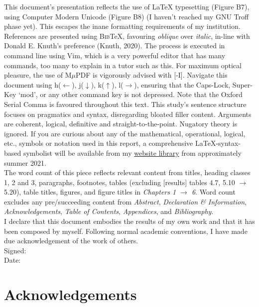 \documentclass[11pt, english]{article}
\begin{document}
	This document’s presentation reflects the use of {\LaTeX} typesetting (Figure B7), using Computer Modern Unicode (Figure B8) (I haven't reached my GNU Troff phase yet). This escapes the inane formatting requirements of my institution. References are presented using \textsc{Bib}{\TeX}, favouring \textsl{oblique} over \textit{italic}, in-line with Donald E. Knuth’s preference (Knuth, 2020). The process is executed in command line using Vim, which is a very powerful editor that has many commands, too many to explain in a tutor such as this. For maximum optical pleasure, the use of M$\mu$PDF is vigorously advised with [-I]. Navigate this document using h($\leftarrow$), j($\downarrow$), k($\uparrow$), l($\rightarrow$), ensuring that the Caps-Lock, Super-Key `mod', or any other command key is not depressed. Note that the Oxford Serial Comma is favoured throughout this text. This study's sentence structure focuses on pragmatics and syntax, disregarding bloated filler content. Arguments are coherent, logical, definitive and straight-to-the-point. Nugatory theory is ignored. If you are curious about any of the mathematical, operational, logical, etc., symbols or notation used in this report, a comprehensive {\LaTeX}-syntax-based symbolist will be available from my \href{http://lewisbritton.com/Library.html}{website library} from approximately summer 2021.\\
 
	The word count of this piece reflects relevant content from titles, heading classes 1, 2 and 3, paragraphs, footnotes, tables (excluding [results] tables 4.7, 5.10 $\rightarrow$ 5.20), table titles, figures, and figure titles in \textit{Chapters 1 $\rightarrow$ 6}. Word count excludes any pre/succeeding content from \textit{Abstract}, \textit{Declaration \& Information}, \textit{Acknowledgements}, \textit{Table of Contents}, \textit{Appendices}, and \textit{Bibliography}.\\

	I declare that this document embodies the results of my own work and that it has been composed by myself. Following normal academic conventions, I have made due acknowledgement of the work of others.\\

	Signed:\\ 

	Date:

\newpage

	\section*{Acknowledgements}
\end{document}
